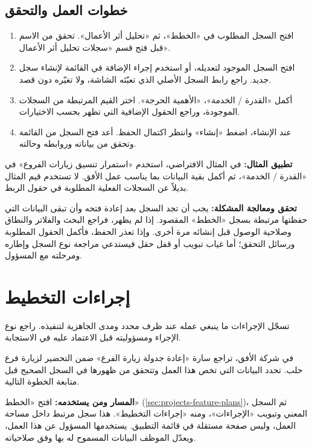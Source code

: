 \subsection{خطوات العمل والتحقق}
\begin{enumerate}
\item افتح السجل المطلوب في «الخطط»، ثم «تحليل أثر الأعمال». تحقق من الاسم قبل فتح قسم «سجلات تحليل أثر الأعمال».
\item افتح السجل الموجود لتعديله، أو استخدم إجراء الإضافة في القائمة لإنشاء سجل جديد. راجع رابط السجل الأصلي الذي تعبّئه الشاشة، ولا تغيّره دون قصد.
\item أكمل «القدرة / الخدمة»، «الأهمية الحرجة». اختر القيم المرتبطة من السجلات الموجودة، وراجع الحقول الإضافية التي تظهر بحسب الاختيارات.
\item عند الإنشاء، اضغط «إنشاء» وانتظر اكتمال الحفظ. أعد فتح السجل من القائمة وتحقق من بياناته وروابطه وحالته.
\end{enumerate}

\textbf{تطبيق المثال:} في المثال الافتراضي، استخدم «استمرار تنسيق زيارات الفروع» في «القدرة / الخدمة»، ثم أكمل بقية البيانات بما يناسب عمل الأفق. لا تستخدم قيم المثال بديلاً عن السجلات الفعلية المطلوبة في حقول الربط.

\textbf{تحقق ومعالجة المشكلة:} يجب أن تجد السجل بعد إعادة فتحه وأن تبقى البيانات التي حفظتها مرتبطة بسجل «الخطط» المقصود. إذا لم يظهر، فراجع البحث والفلاتر والنطاق وصلاحية الوصول قبل إنشائه مرة أخرى. وإذا تعذر الحفظ، فأكمل الحقول المطلوبة ورسائل التحقق؛ أما غياب تبويب أو قفل حقل فيستدعي مراجعة نوع السجل وإطاره ومرحلته مع المسؤول.

\clearpage
\section{إجراءات التخطيط}
\label{sec:projects-feature-planning-procedures}

تسجّل الإجراءات ما ينبغي عمله عند ظرف محدد ومدى الجاهزية لتنفيذه. راجع نوع الإجراء ومسؤوليته قبل الاعتماد عليه في الاستجابة.

\begin{rcnote}
في شركة الأفق، تراجع سارة «إعادة جدولة زيارة الفرع» ضمن التحضير لزيارة فرع حلب. تحدد البيانات التي تخص هذا العمل وتتحقق من ظهورها في السجل الصحيح قبل متابعة الخطوة التالية.
\end{rcnote}

\textbf{المسار ومن يستخدمه:} افتح «الخطط» (\ref{sec:projects-feature-plans})، ثم السجل المعني وتبويب «الإجراءات»، ومنه «إجراءات التخطيط». هذا سجل مرتبط داخل مساحة العمل، وليس صفحة مستقلة في قائمة التطبيق. يستخدمها المسؤول عن هذا العمل، ويعدّل الموظف البيانات المسموح له بها وفق صلاحياته.

